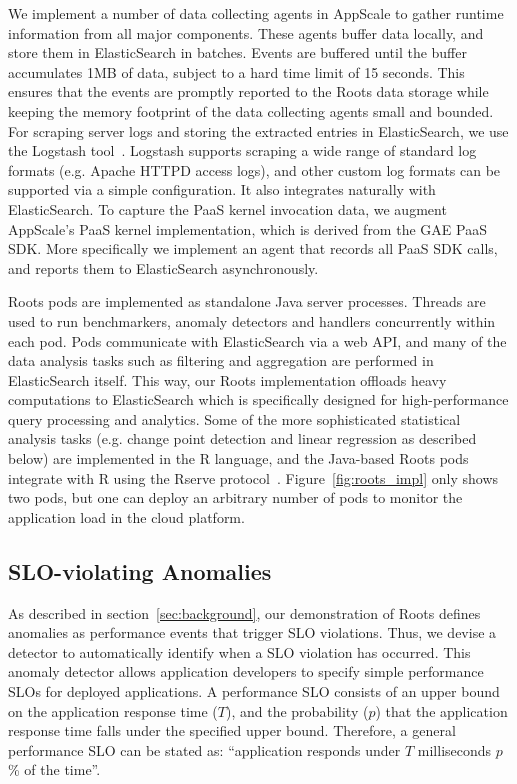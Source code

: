 We implement a number of data collecting agents in AppScale to gather runtime information
from all major components. These agents buffer data locally, and store them in ElasticSearch
in batches. Events are buffered until the buffer accumulates 1MB of data, subject to a hard time limit of 
15 seconds. This ensures that the events are promptly reported to the Roots data
storage while keeping the memory footprint of the data collecting agents small and bounded. 
For scraping server logs and storing the extracted entries in ElasticSearch,
we use the Logstash tool~\cite{logstash}. Logstash supports scraping a wide range of standard log formats (e.g. 
Apache HTTPD access logs), and other custom log formats can be supported via a simple configuration.
It also integrates naturally with ElasticSearch.
To capture the PaaS kernel invocation data, we augment AppScale's PaaS kernel implementation,
which is derived from the GAE PaaS SDK. More specifically we implement an agent that records
all PaaS SDK calls, and reports them to ElasticSearch asynchronously. 

Roots pods are implemented as standalone Java server processes. Threads are used to run benchmarkers,
anomaly detectors and handlers concurrently within each pod. Pods communicate with ElasticSearch via
a web API, and many of the data analysis tasks such as filtering and aggregation are performed
in ElasticSearch itself. 
This way, our Roots implementation offloads heavy computations 
to ElasticSearch which is specifically designed for high-performance query processing
and analytics. Some of the more sophisticated statistical analysis tasks (e.g. change point detection and 
linear regression as described below) are implemented in the R
language, and the Java-based Roots pods integrate with R using the Rserve protocol~\cite{Urbanek03rserve--}.
Figure~\ref{fig:roots_impl} only shows two pods, but one can deploy an arbitrary number of pods to
monitor the application load in the cloud platform.

\subsection{SLO-violating Anomalies}

As described in section~\ref{sec:background}, our
demonstration of Roots defines anomalies as performance events that trigger SLO
violations. Thus, we devise a detector to automatically identify when a SLO
violation has occurred. This anomaly detector
allows application developers to specify simple performance SLOs for deployed applications. A
performance SLO consists of an upper bound on the application response time ($T$), and the probability ($p$)
that the application response time falls under the specified upper bound. Therefore, a general performance 
SLO can be stated as: ``application responds under $T$ milliseconds $p$\% of the time''.

